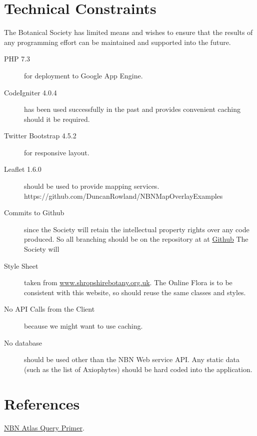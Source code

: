 \documentclass[a4paper,12pt,landscape]{article}
\begin{document}
\section{Technical Constraints}


The Botanical Society has limited means
and wishes to ensure that the results of any programming effort
can be maintained and supported
into the future.

\begin{description}
    \item[PHP 7.3] for deployment to Google App Engine.
    \item[CodeIgniter 4.0.4] has been used successfully in the past and provides convenient caching should it be required.
    \item[Twitter Bootstrap 4.5.2] for responsive layout.
    \item[Leaflet 1.6.0] should be used to provide mapping services.
     https://github.com/DuncanRowland/NBNMapOverlayExamples
    \item[Commits to Github] since the Society will retain the intellectual property rights
      over any code produced.
      So all branching should be on the repository at
      at \href{https://github.com/joejcollins/captain-magenta.git}{Github}
      The Society will
    \item[Style Sheet] taken from \href{https://www.shropshirebotany.org.uk/}{www.shropshirebotany.org.uk}.
      The Online Flora is to be consistent with this website,
      so should reuse the same classes and styles.
    \item[No API Calls from the Client] because we might want to use caching.
    \item[No database] should be used other than the NBN Web service API.
      Any static data 
      (such as the list of Axiophytes)
      should be hard coded into the application.
\end{description}


\section{References}

\href{https://docs.google.com/document/d/1FiVasGGZ3kRPnu5347GPAef7Tr5LvvghCS6x82xnfu4/edit}{NBN Atlas Query Primer}.
\end{document}
